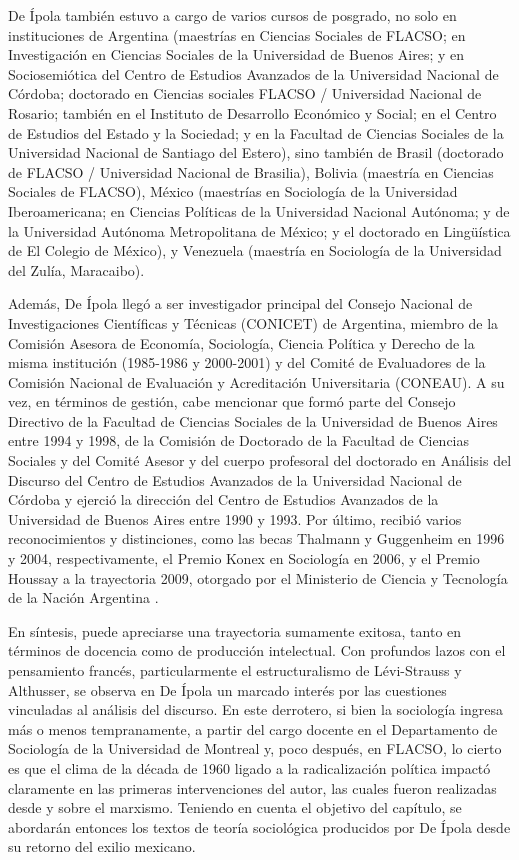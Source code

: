 De Ípola también estuvo a cargo de varios cursos de posgrado, no solo en instituciones de Argentina (maestrías en Ciencias Sociales de FLACSO; en Investigación en Ciencias Sociales de la Universidad de Buenos Aires; y en Sociosemiótica del Centro de Estudios Avanzados de la Universidad Nacional de Córdoba; doctorado en Ciencias sociales FLACSO / Universidad Nacional de Rosario; también en el Instituto de Desarrollo Económico y Social; en el Centro de Estudios del Estado y la Sociedad; y en la Facultad de Ciencias Sociales de la Universidad Nacional de Santiago del Estero), sino también de Brasil (doctorado de FLACSO / Universidad Nacional de Brasilia), Bolivia (maestría en Ciencias Sociales de FLACSO), México (maestrías en Sociología de la Universidad Iberoamericana; en Ciencias Políticas de la Universidad Nacional Autónoma; y de la Universidad Autónoma Metropolitana de México; y el doctorado en Lingüística de El Colegio de México), y Venezuela (maestría en Sociología de la Universidad del Zulía, Maracaibo).

Además, De Ípola llegó a ser investigador principal del Consejo Nacional de Investigaciones Científicas y Técnicas (CONICET) de Argentina, miembro de la Comisión Asesora de Economía, Sociología, Ciencia Política y Derecho de la misma institución (1985-1986 y 2000-2001) y del Comité de Evaluadores de la Comisión Nacional de Evaluación y Acreditación Universitaria (CONEAU). A su vez, en términos de gestión, cabe mencionar que formó parte del Consejo Directivo de la Facultad de Ciencias Sociales de la Universidad de Buenos Aires entre 1994 y 1998, de la Comisión de Doctorado de la Facultad de Ciencias Sociales y del Comité Asesor y del cuerpo profesoral del doctorado en Análisis del Discurso del Centro de Estudios Avanzados de la Universidad Nacional de Córdoba y ejerció la dirección del Centro de Estudios Avanzados de la Universidad de Buenos Aires entre 1990 y 1993. Por último, recibió varios reconocimientos y distinciones, como las becas Thalmann y Guggenheim en 1996 y 2004, respectivamente, el Premio Konex en Sociología en 2006, y el Premio Houssay a la trayectoria 2009, otorgado por el Ministerio de Ciencia y Tecnología de la Nación Argentina \parencite{1608-DEIPOLA2010}.

En síntesis, puede apreciarse una trayectoria sumamente exitosa, tanto en términos de docencia como de producción intelectual. Con profundos lazos con el pensamiento francés, particularmente el estructuralismo de Lévi-Strauss y Althusser, se observa en De Ípola un marcado interés por las cuestiones vinculadas al análisis del discurso. En este derrotero, si bien la sociología ingresa más o menos tempranamente, a partir del cargo docente en el Departamento de Sociología de la Universidad de Montreal y, poco después, en FLACSO, lo cierto es que el clima de la década de 1960 ligado a la radicalización política impactó claramente en las primeras intervenciones del autor, las cuales fueron realizadas desde y sobre el marxismo. Teniendo en cuenta el objetivo del capítulo, se abordarán entonces los textos de teoría sociológica producidos por De Ípola desde su retorno del exilio mexicano.


